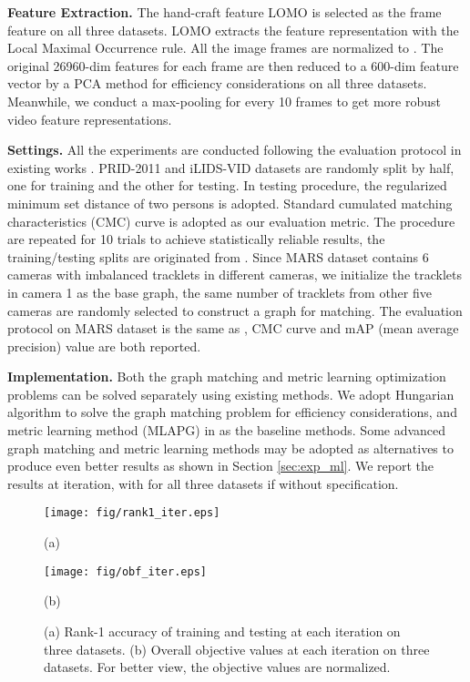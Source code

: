 \documentclass[10pt,twocolumn,letterpaper]{article}
\begin{document}
\textbf{Feature Extraction.} The hand-craft feature LOMO \cite{cvpr15lomo} is selected as the frame feature on all three datasets. LOMO extracts the feature representation with the Local Maximal Occurrence rule. All the image frames are normalized to . The original 26960-dim features for each frame are then reduced to a 600-dim feature vector by a PCA method for efficiency considerations on all three datasets. Meanwhile, we conduct a max-pooling for every 10 frames to get more robust video feature representations.

\textbf{Settings.} All the experiments are conducted following the evaluation protocol in existing works \cite{ijcai16video,cvpr16top}. PRID-2011 and iLIDS-VID datasets are randomly split by half, one for training and the other for testing. In testing procedure, the regularized minimum set distance \cite{yang2013face} of two persons is adopted. Standard cumulated matching characteristics (CMC) curve is adopted as our evaluation metric. The procedure are repeated for 10 trials to achieve statistically reliable results, the training/testing splits are originated from \cite{cvpr16top}. Since MARS dataset contains 6 cameras with imbalanced tracklets in different cameras, we initialize the tracklets in camera 1 as the base graph, the same number of tracklets from other five cameras are randomly selected to construct a graph for matching. The evaluation protocol on MARS dataset is the same as \cite{eccv16mars}, CMC curve and mAP (mean average precision) value are both reported.

\textbf{Implementation.} Both the graph matching and metric learning optimization problems can be solved separately using existing methods. We adopt Hungarian algorithm to solve the graph matching problem for efficiency considerations, and metric learning method (MLAPG) in \cite{iccv15liao} as the baseline methods. Some advanced graph matching and metric learning methods may be adopted as alternatives to produce even better results as shown in Section \ref{sec:exp_ml}. We report the results at  iteration, with  for all three datasets if without specification.
\begin{figure}[t]
  \centering
  \begin{minipage}[t]{0.25\textwidth}
        \centering
        \texttt{[image: fig/rank1\_iter.eps]}
        \centerline{\small{(a) } }\medskip
    \end{minipage}\begin{minipage}[t]{0.25\textwidth}
        \centering
        \texttt{[image: fig/obf\_iter.eps]}
        \centerline{\small{(b) }}\medskip
    \end{minipage}\caption{\small{(a) Rank-1 accuracy of training and testing at each iteration on three datasets. (b) Overall objective values at each iteration on three datasets. For better view, the objective values are normalized.}}\label{fig:iter}
\vspace{-0.1cm}
\end{figure}
\end{document}
